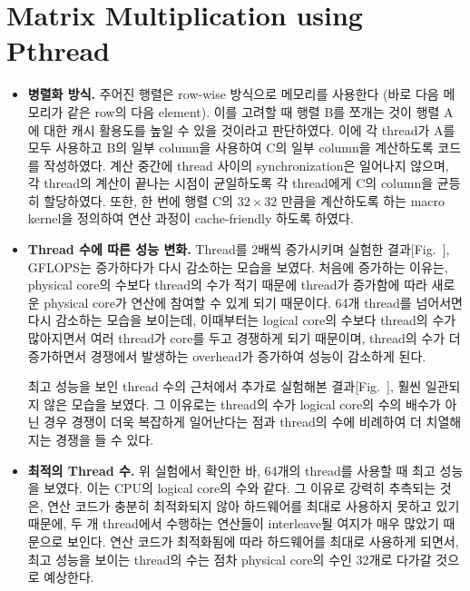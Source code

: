 \section{Matrix Multiplication using Pthread}

\begin{itemize}

    \item {
        \textbf{병렬화 방식.}
        주어진 행렬은 row-wise 방식으로 메모리를 사용한다 (바로 다음 메모리가 같은 row의 다음 element).
        이를 고려할 때 행렬 B를 쪼개는 것이 행렬 A에 대한 캐시 활용도를 높일 수 있을 것이라고 판단하였다.
        이에 각 thread가 A를 모두 사용하고 B의 일부 column을 사용하여 C의 일부 column을 계산하도록
        코드를 작성하였다.
        계산 중간에 thread 사이의 synchronization은 일어나지 않으며, 각 thread의 계산이 끝나는
        시점이 균일하도록 각 thread에게 C의 column을 균등히 할당하였다.
        또한, 한 번에 행렬 C의 $32 \times 32$ 만큼을 계산하도록 하는 macro kernel을 정의하여
        연산 과정이 cache-friendly 하도록 하였다.
    }
    \item {
        \textbf{Thread 수에 따른 성능 변화.}
        Thread를 2배씩 증가시키며 실험한 결과[Fig.~{}], GFLOPS는 증가하다가 다시 감소하는 모습을 보였다.
        처음에 증가하는 이유는, physical core의 수보다 thread의 수가 적기 때문에 thread가 증가함에 따라
        새로운 physical core가 연산에 참여할 수 있게 되기 때문이다.
        64개 thread를 넘어서면 다시 감소하는 모습을 보이는데, 이때부터는 logical core의 수보다
        thread의 수가 많아지면서 여러 thread가 core를 두고 경쟁하게 되기 때문이며,
        thread의 수가 더 증가하면서 경쟁에서 발생하는 overhead가 증가하여 성능이 감소하게 된다.

        최고 성능을 보인 thread 수의 근처에서 추가로 실험해본 결과[Fig.~{}], 훨씬 일관되지 않은 모습을 보였다.
        그 이유로는 thread의 수가 logical core의 수의 배수가 아닌 경우 경쟁이 더욱 복잡하게 일어난다는 점과
        thread의 수에 비례하여 더 치열해지는 경쟁을 들 수 있다.
    }
    \item {
        \textbf{최적의 Thread 수.}
        위 실험에서 확인한 바, 64개의 thread를 사용할 때 최고 성능을 보였다.
        이는 CPU의 logical core의 수와 같다. 그 이유로 강력히 추측되는 것은,
        연산 코드가 충분히 최적화되지 않아 하드웨어를 최대로 사용하지 못하고 있기 때문에,
        두 개 thread에서 수행하는 연산들이 interleave될 여지가 매우 많았기 때문으로 보인다.
        연산 코드가 최적화됨에 따라 하드웨어를 최대로 사용하게 되면서,
        최고 성능을 보이는 thread의 수는 점차 physical core의 수인 32개로 다가갈 것으로 예상한다.

}
\end{itemize}
